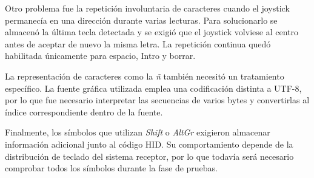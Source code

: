 Otro problema fue la repetición involuntaria de caracteres cuando el joystick permanecía en una dirección durante varias lecturas. Para solucionarlo se almacenó la última tecla detectada y se exigió que el joystick volviese al centro antes de aceptar de nuevo la misma letra. La repetición continua quedó habilitada únicamente para espacio, Intro y borrar.

La representación de caracteres como la \textit{ñ} también necesitó un tratamiento específico. La fuente gráfica utilizada emplea una codificación distinta a UTF-8, por lo que fue necesario interpretar las secuencias de varios bytes y convertirlas al índice correspondiente dentro de la fuente.

Finalmente, los símbolos que utilizan \textit{Shift} o \textit{AltGr} exigieron almacenar información adicional junto al código HID. Su comportamiento depende de la distribución de teclado del sistema receptor, por lo que todavía será necesario comprobar todos los símbolos durante la fase de pruebas.



